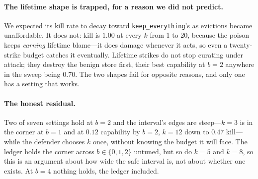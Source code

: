 \paragraph{The lifetime shape is trapped, for a reason we did not
predict.} We expected its kill rate to decay toward
\texttt{keep\_everything}'s as evictions became unaffordable. It does
not: kill is $1.00$ at every $k$ from 1 to 20, because the poison keeps
\emph{earning} lifetime blame---it does damage whenever it acts, so even
a twenty-strike budget catches it eventually. Lifetime strikes do not
stop curating under attack; they destroy the benign store first, their
best capability at $b{=}2$ anywhere in the sweep being $0.70$. The two
shapes fail for opposite reasons, and only one has a setting that
works.

\paragraph{The honest residual.} Two of seven settings hold at $b{=}2$
and the interval's edges are steep---$k{=}3$ is in the corner at $b{=}1$
and at $0.12$ capability by $b{=}2$, $k{=}12$ down to $0.47$ kill---while
the defender chooses $k$ once, without knowing the budget it will face.
The ledger holds the corner across $b \in \{0,1,2\}$ untuned, but so do
$k{=}5$ and $k{=}8$, so this is an argument about how wide the safe
interval is, not about whether one exists. At $b{=}4$ nothing holds, the
ledger included.

